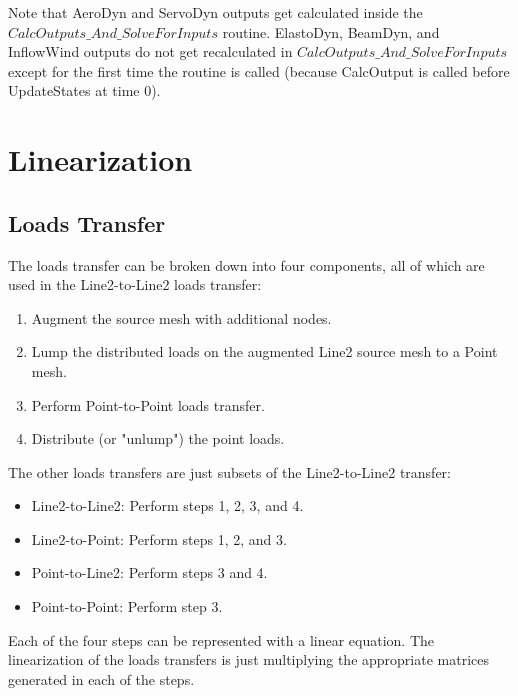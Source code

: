 \documentclass[10pt,letterpaper,oneside,notitlepage]{article}
\begin{document}
Note that AeroDyn and ServoDyn outputs get calculated inside the ${CalcOutputs\_And\_SolveForInputs}$ routine. ElastoDyn, BeamDyn, and
InflowWind outputs do not get recalculated in ${CalcOutputs\_And\_SolveForInputs}$ except for the first time the routine is called
(because CalcOutput is called before UpdateStates at time 0).


\section {Linearization}
\subsection{Loads Transfer}
The loads transfer can be broken down into four components, all of which are used in the Line2-to-Line2 loads transfer:
\begin{enumerate}
  \item Augment the source mesh with additional nodes.
  \item Lump the distributed loads on the augmented Line2 source mesh to a Point mesh.
  \item Perform Point-to-Point loads transfer.
  \item Distribute (or "unlump") the point loads.   
\end{enumerate}
The other loads transfers are just subsets of the Line2-to-Line2 transfer:
\begin{itemize}
  \item Line2-to-Line2: Perform steps 1, 2, 3, and 4.
  \item Line2-to-Point: Perform steps 1, 2, and 3.
  \item Point-to-Line2: Perform steps 3 and 4.
  \item Point-to-Point: Perform step 3.
\end{itemize}


Each of the four steps can be represented with a linear equation. The linearization of the loads transfers is just multiplying the 
appropriate matrices generated in each of the steps.
\end{document}
